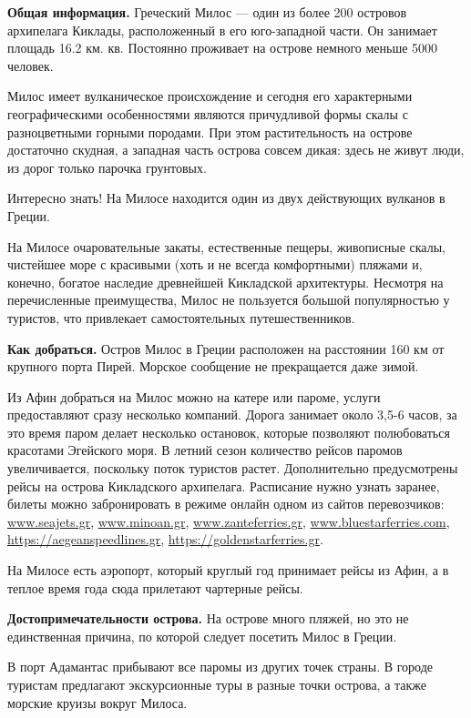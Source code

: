 \textbf{Общая информация.}
Греческий Милос — один из более 200 островов архипелага Киклады, расположенный в его юго-западной части. Он занимает площадь 16.2 км. кв. Постоянно проживает на острове немного меньше 5000 человек.

Милос имеет вулканическое происхождение и сегодня его характерными географическими особенностями являются причудливой формы скалы с разноцветными горными породами. При этом растительность на острове достаточно скудная, а западная часть острова совсем дикая: здесь не живут люди, из дорог только парочка грунтовых.

\begin{fancyquotes}
    Интересно знать! На Милосе находится один из двух действующих вулканов в Греции.
\end{fancyquotes}

На Милосе очаровательные закаты, естественные пещеры, живописные скалы, чистейшее море с красивыми (хоть и не всегда комфортными) пляжами и, конечно, богатое наследие древнейшей Кикладской архитектуры. Несмотря на перечисленные преимущества, Милос не пользуется большой популярностью у туристов, что привлекает самостоятельных путешественников.


\textbf{Как добраться.}
Остров Милос в Греции расположен на расстоянии 160 км от крупного порта Пирей. Морское сообщение не прекращается даже зимой.

Из Афин добраться на Милос можно на катере или пароме, услуги предоставляют сразу несколько компаний. Дорога занимает около 3,5-6 часов, за это время паром делает несколько остановок, которые позволяют полюбоваться красотами Эгейского моря. В летний сезон количество рейсов паромов увеличивается, поскольку поток туристов растет. Дополнительно предусмотрены рейсы на острова Кикладского архипелага. Расписание нужно узнать заранее, билеты можно забронировать в режиме онлайн одном из сайтов перевозчиков: \url{www.seajets.gr}, \url{www.minoan.gr}, \url{www.zanteferries.gr}, \url{www.bluestarferries.com}, \url{https://aegeanspeedlines.gr}, \url{https://goldenstarferries.gr}.

На Милосе есть аэропорт, который круглый год принимает рейсы из Афин, а в теплое время года сюда прилетают чартерные рейсы.

\textbf{Достопримечательности острова.}
На острове много пляжей, но это не единственная причина, по которой следует посетить Милос в Греции.

В порт Адамантас прибывают все паромы из других точек страны. В городе туристам предлагают экскурсионные туры в разные точки острова, а также морские круизы вокруг Милоса.

